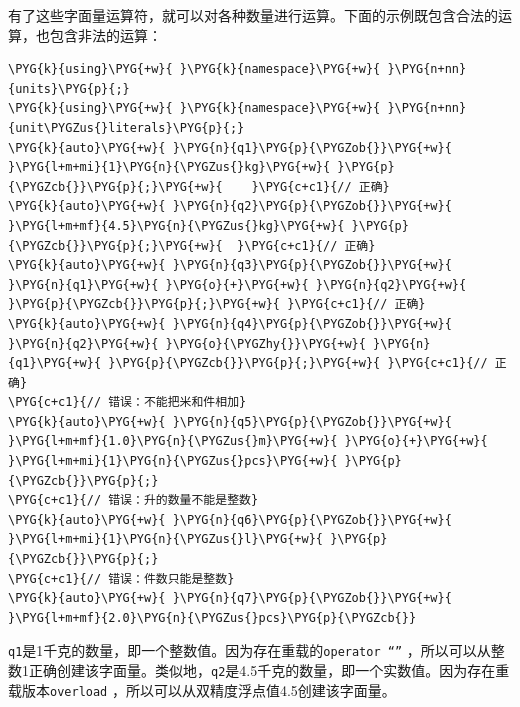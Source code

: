 
有了这些字面量运算符，就可以对各种数量进行运算。下面的示例既包含合法的运算，也包含非法的运算：



\begin{codeblockbg}
\begin{Verbatim}[commandchars=\\\{\},breaklines=true,breakanywhere=true,fontsize=\codefont,xleftmargin=17bp]
\PYG{k}{using}\PYG{+w}{ }\PYG{k}{namespace}\PYG{+w}{ }\PYG{n+nn}{units}\PYG{p}{;}
\PYG{k}{using}\PYG{+w}{ }\PYG{k}{namespace}\PYG{+w}{ }\PYG{n+nn}{unit\PYGZus{}literals}\PYG{p}{;}
\PYG{k}{auto}\PYG{+w}{ }\PYG{n}{q1}\PYG{p}{\PYGZob{}}\PYG{+w}{ }\PYG{l+m+mi}{1}\PYG{n}{\PYGZus{}kg}\PYG{+w}{ }\PYG{p}{\PYGZcb{}}\PYG{p}{;}\PYG{+w}{    }\PYG{c+c1}{// 正确}
\PYG{k}{auto}\PYG{+w}{ }\PYG{n}{q2}\PYG{p}{\PYGZob{}}\PYG{+w}{ }\PYG{l+m+mf}{4.5}\PYG{n}{\PYGZus{}kg}\PYG{+w}{ }\PYG{p}{\PYGZcb{}}\PYG{p}{;}\PYG{+w}{  }\PYG{c+c1}{// 正确}
\PYG{k}{auto}\PYG{+w}{ }\PYG{n}{q3}\PYG{p}{\PYGZob{}}\PYG{+w}{ }\PYG{n}{q1}\PYG{+w}{ }\PYG{o}{+}\PYG{+w}{ }\PYG{n}{q2}\PYG{+w}{ }\PYG{p}{\PYGZcb{}}\PYG{p}{;}\PYG{+w}{ }\PYG{c+c1}{// 正确}
\PYG{k}{auto}\PYG{+w}{ }\PYG{n}{q4}\PYG{p}{\PYGZob{}}\PYG{+w}{ }\PYG{n}{q2}\PYG{+w}{ }\PYG{o}{\PYGZhy{}}\PYG{+w}{ }\PYG{n}{q1}\PYG{+w}{ }\PYG{p}{\PYGZcb{}}\PYG{p}{;}\PYG{+w}{ }\PYG{c+c1}{// 正确}
\PYG{c+c1}{// 错误：不能把米和件相加}
\PYG{k}{auto}\PYG{+w}{ }\PYG{n}{q5}\PYG{p}{\PYGZob{}}\PYG{+w}{ }\PYG{l+m+mf}{1.0}\PYG{n}{\PYGZus{}m}\PYG{+w}{ }\PYG{o}{+}\PYG{+w}{ }\PYG{l+m+mi}{1}\PYG{n}{\PYGZus{}pcs}\PYG{+w}{ }\PYG{p}{\PYGZcb{}}\PYG{p}{;}
\PYG{c+c1}{// 错误：升的数量不能是整数}
\PYG{k}{auto}\PYG{+w}{ }\PYG{n}{q6}\PYG{p}{\PYGZob{}}\PYG{+w}{ }\PYG{l+m+mi}{1}\PYG{n}{\PYGZus{}l}\PYG{+w}{ }\PYG{p}{\PYGZcb{}}\PYG{p}{;}
\PYG{c+c1}{// 错误：件数只能是整数}
\PYG{k}{auto}\PYG{+w}{ }\PYG{n}{q7}\PYG{p}{\PYGZob{}}\PYG{+w}{ }\PYG{l+m+mf}{2.0}\PYG{n}{\PYGZus{}pcs}\PYG{p}{\PYGZcb{}}
\end{Verbatim}
\end{codeblockbg}



\texttt{q1}是1千克的数量，即一个整数值。因为存在重载的\texttt{operator “”} ，所以可以从整数1正确创建该字面量。类似地，\texttt{q2}是4.5千克的数量，即一个实数值。因为存在重载版本\texttt{overload} ，所以可以从双精度浮点值4.5创建该字面量。



